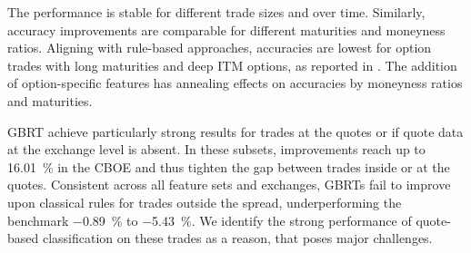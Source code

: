 The performance is stable for different trade sizes and over time. Similarly, accuracy improvements are comparable for different maturities and moneyness ratios. Aligning with rule-based approaches, accuracies are lowest for option trades with long maturities and deep \gls{ITM} options, as reported in \textcite[][22]{grauerOptionTradeClassification2022}. The addition of option-specific features has annealing effects on accuracies by moneyness ratios and maturities.

\gls{GBRT} achieve particularly strong results for trades at the quotes or if quote data at the exchange level is absent. In these subsets, improvements reach up to \SI{16.01}{\percent} in the \gls{CBOE} and thus tighten the gap between trades inside or at the quotes. Consistent across all feature sets and exchanges, \glspl{GBRT} fail to improve upon classical rules for trades outside the spread, underperforming the benchmark \SI{-0.89}{\percent} to \SI{-5.43}{\percent}. We identify the strong performance of quote-based classification on these trades as a reason, that poses major challenges.

